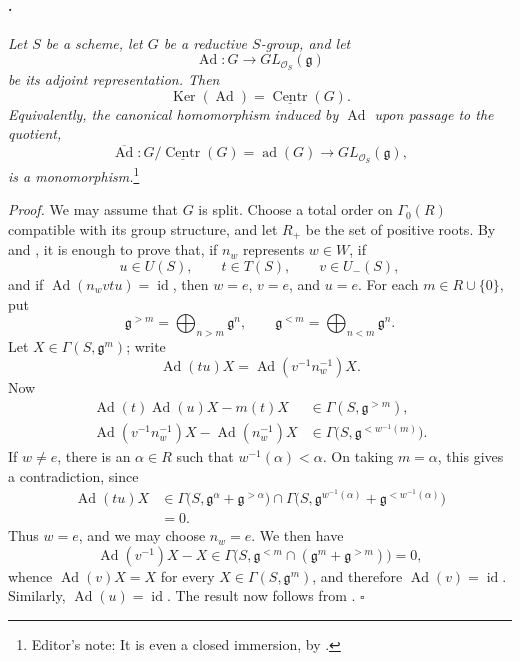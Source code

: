 \paragraph{.}
\textit{Let \(S\) be a scheme, let \(G\) be a reductive
\(S\)-group, and let}
\[
  \operatorname{Ad}\colon
  G\longrightarrow GL_{\mathcal O_S}(\mathfrak g)
\]
\textit{be its adjoint representation. Then}
\[
  \operatorname{Ker}(\operatorname{Ad})
  =
  \underline{\operatorname{Centr}}(G).
\]
\textit{Equivalently, the canonical homomorphism induced by
\(\operatorname{Ad}\) upon passage to the quotient,}
\[
  \overline{\operatorname{Ad}}\colon
  G/\underline{\operatorname{Centr}}(G)
  =
  \operatorname{ad}(G)
  \longrightarrow
  GL_{\mathcal O_S}(\mathfrak g),
\]
\textit{is a monomorphism.}\footnote{Editor's note: It is even a
closed immersion, by \textup{}.}

\textit{Proof.}
We may assume that \(G\) is split. Choose a total order on
\(\Gamma_0(R)\) compatible with its group structure, and let
\(R_+\) be the set of positive roots. By  \textup{} and
, it is enough to prove that, if \(n_w\) represents
\(w\in W\), if
\[
  u\in U(S),\qquad t\in T(S),\qquad v\in U_-(S),
\]
and if \(\operatorname{Ad}(n_wvtu)=\operatorname{id}\), then
\(w=e\), \(v=e\), and \(u=e\). For each \(m\in R\cup\{0\}\), put
\[
  \mathfrak g^{>m}
  =
  \bigoplus_{n>m}\mathfrak g^n,
  \qquad
  \mathfrak g^{<m}
  =
  \bigoplus_{n<m}\mathfrak g^n.
\]
Let \(X\in\Gamma(S,\mathfrak g^m)\); write
\[
  \operatorname{Ad}(tu)X
  =
  \operatorname{Ad}(v^{-1}n_w^{-1})X.
\]
Now
\[
\begin{aligned}
  \operatorname{Ad}(t)\operatorname{Ad}(u)X-m(t)X
  &\in\Gamma(S,\mathfrak g^{>m}),\\
  \operatorname{Ad}(v^{-1}n_w^{-1})X
  -\operatorname{Ad}(n_w^{-1})X
  &\in\Gamma\bigl(S,\mathfrak g^{<w^{-1}(m)}\bigr).
\end{aligned}
\]
If \(w\ne e\), there is an \(\alpha\in R\) such that
\(w^{-1}(\alpha)<\alpha\). On taking \(m=\alpha\), this gives a
contradiction, since
\[
\begin{aligned}
  \operatorname{Ad}(tu)X
  &\in
  \Gamma\bigl(S,\mathfrak g^\alpha+\mathfrak g^{>\alpha}\bigr)
  \cap
  \Gamma\bigl(
    S,
    \mathfrak g^{w^{-1}(\alpha)}
    +\mathfrak g^{<w^{-1}(\alpha)}
  \bigr)\\
  &=0.
\end{aligned}
\]
Thus \(w=e\), and we may choose \(n_w=e\). We then have
\[
  \operatorname{Ad}(v^{-1})X-X
  \in
  \Gamma\bigl(
    S,
    \mathfrak g^{<m}\cap
    (\mathfrak g^m+\mathfrak g^{>m})
  \bigr)
  =0,
\]
whence \(\operatorname{Ad}(v)X=X\) for every
\(X\in\Gamma(S,\mathfrak g^m)\), and therefore
\(\operatorname{Ad}(v)=\operatorname{id}\). Similarly,
\(\operatorname{Ad}(u)=\operatorname{id}\). The result now follows
from .
\hfill\(\square\)


